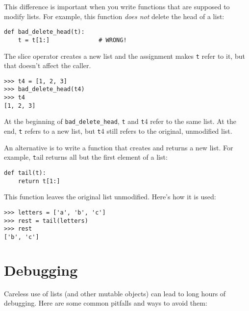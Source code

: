 \documentclass[
DIV=11,
fontsize=12,
twoside,
headinclude=false,
titlepage=firstiscover,
abstract=true,
headsepline=true,
footsepline=true,
chapterprefix=true, %
headings=big,
bibliography=totoc,%
captions=tableheading
]{scrbook}
\theoremstyle{definition}
\begin{document}
This difference is important when you write functions that
are supposed to modify lists.  For example, this function
{\em does not} delete the head of a list:
%
\begin{lstlisting}
def bad_delete_head(t):
    t = t[1:]              # WRONG!
\end{lstlisting}
%
The slice operator creates a new list and the assignment
makes {\texttt t} refer to it, but that doesn't affect the caller.
%
\begin{lstlisting}
>>> t4 = [1, 2, 3]
>>> bad_delete_head(t4)
>>> t4
[1, 2, 3]
\end{lstlisting}
%
At the beginning of \verb"bad_delete_head", {\texttt t} and {\texttt t4}
refer to the same list.  At the end, {\texttt t} refers to a new list,
but {\texttt t4} still refers to the original, unmodified list.

An alternative is to write a function that creates and
returns a new list.  For
example, {\texttt tail} returns all but the first
element of a list:

\begin{lstlisting}
def tail(t):
    return t[1:]
\end{lstlisting}
%
This function leaves the original list unmodified.
Here's how it is used:

\begin{lstlisting}
>>> letters = ['a', 'b', 'c']
>>> rest = tail(letters)
>>> rest
['b', 'c']
\end{lstlisting}



\section{Debugging}

Careless use of lists (and other mutable objects)
can lead to long hours of debugging.  Here are some common
pitfalls and ways to avoid them:
\end{document}

